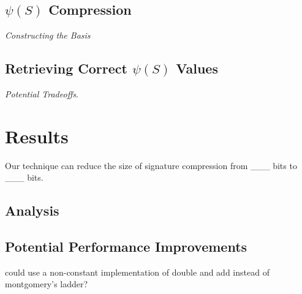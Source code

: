 \subsection{$\psi(S)$ Compression}

\noindent
\textit{Constructing the Basis}

\subsection{Retrieving Correct $\psi(S)$ Values}

\noindent
\textit{Potential Tradeoffs}.

\section{Results}

Our technique can reduce the size of \sidh signature compression from \_\_\_ bits to \_\_\_ bits.

\subsection{Analysis}

\subsection{Potential Performance Improvements}

could use a non-constant implementation of double and add instead of montgomery's ladder? 

